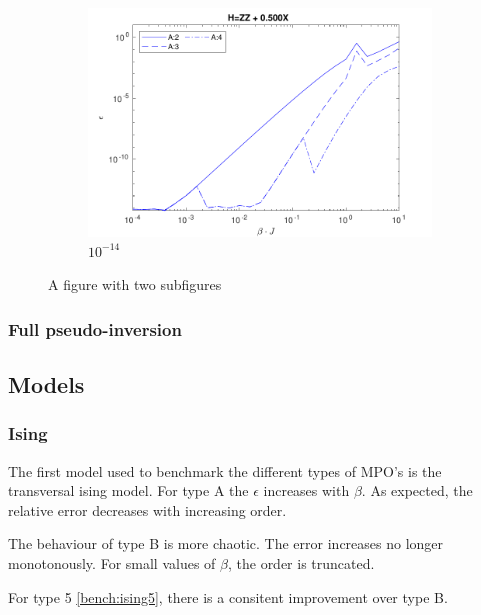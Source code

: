 \begin{figure} \ContinuedFloat
    \centering
    \begin{subfigure}{\textwidth}
        \centering
        \includegraphics[width=0.8\linewidth]{Figuren/mpo_construction/sigm0/e14.pdf}
        \caption{ ${10}^{-14}$}
        \label{fig:sub1}
    \end{subfigure}%
    \caption{A figure with two subfigures}
    \label{fig:sigman0}
\end{figure}

\subsubsection{Full pseudo-inversion}

\subsection{Models}

\subsubsection{Ising}

The first model used to benchmark the different types of MPO's is the transversal ising model. For type A the $\epsilon$ increases with
$\beta$. As expected, the relative error decreases with increasing order.

The behaviour of type B is more chaotic. The error increases no longer monotonously. For small values of $\beta$, the order is truncated.

For type 5 \cref{bench:ising5}, there is a consitent improvement over type B. 

